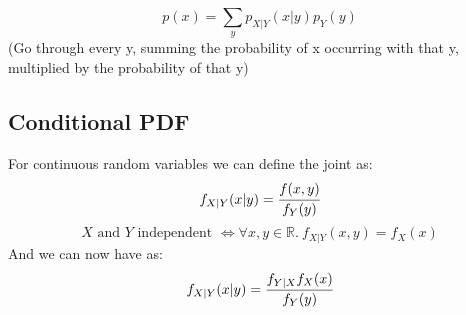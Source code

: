 \documentclass{report}
\begin{document}
             {
                \[p(x) = \sum_yp_{X|Y}(x|y)p_Y(y)\]
                (Go through every y, summing the probability of x occurring with that y, multiplied by the probability of that y)
            }
        \subsection*{Conditional PDF}
            For continuous random variables we can define the joint  as:
            \[f_{X|Y}(x|y) = \cfrac{f(x,y)}{f_Y(y)}\]
            \[\text{$X$ and $Y$ independent } \Leftrightarrow \forall x,y \in \mathbb{R}. \ f_{X|Y}(x,y) = f_X(x)\]
            And we can now have  as:
            \[f_{X|Y}(x|y) = \cfrac{f_{Y|X} f_X(x)}{f_Y(y)}\]
            
\end{document}
